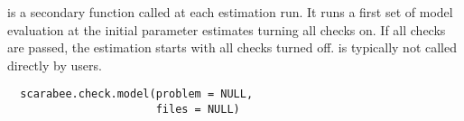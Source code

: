 %
\begin{Description}\relax
{} is a secondary function called at each 
 estimation run. It runs a first set of model evaluation at the 
initial parameter estimates turning all checks on. If all checks are passed,
the estimation starts with all checks turned off. 
is typically not called directly by users.
\end{Description}
%
\begin{Usage}
\begin{verbatim}
  scarabee.check.model(problem = NULL,
                       files = NULL)
\end{verbatim}
\end{Usage}
%
